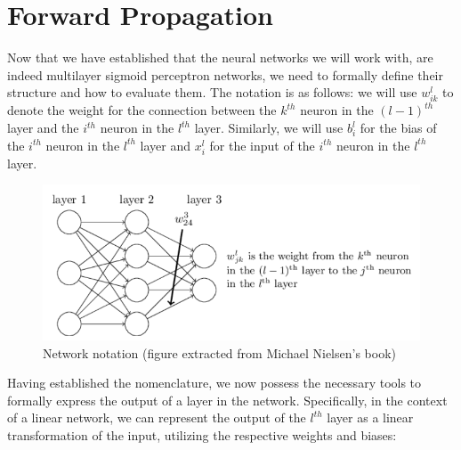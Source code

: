 \documentclass[../main]{subfiles}
\begin{document}
\section{Forward Propagation}
Now that we have established that the neural networks we will work with, are indeed multilayer sigmoid perceptron networks, we need to formally define their structure and how to evaluate them. The notation is as follows: we will use $w_{ik}^{l}$ to denote the weight for the connection between the $k^{th}$ neuron in the $(l-1)^{th}$ layer and the $i^{th}$ neuron in the $l^{th}$ layer. Similarly, we will use $b_{i}^{l}$ for the bias of the $i^{th}$ neuron in the $l^{th}$ layer and $x_{i}^{l}$ for the input of the $i^{th}$ neuron in the $l^{th}$ layer.
\begin{figure}[H]
  \centering
  \includegraphics[width=1\textwidth]{./figures/network}
  \caption{Network notation (figure extracted from Michael Nielsen's book)}
  \label{fig:red}
\end{figure}
Having established the nomenclature, we now possess the necessary tools to formally express the output of a layer in the network. Specifically, in the context of a linear network, we can represent the output of the $l^{th}$ layer as a linear transformation of the input, utilizing the respective weights and biases:
\end{document}
